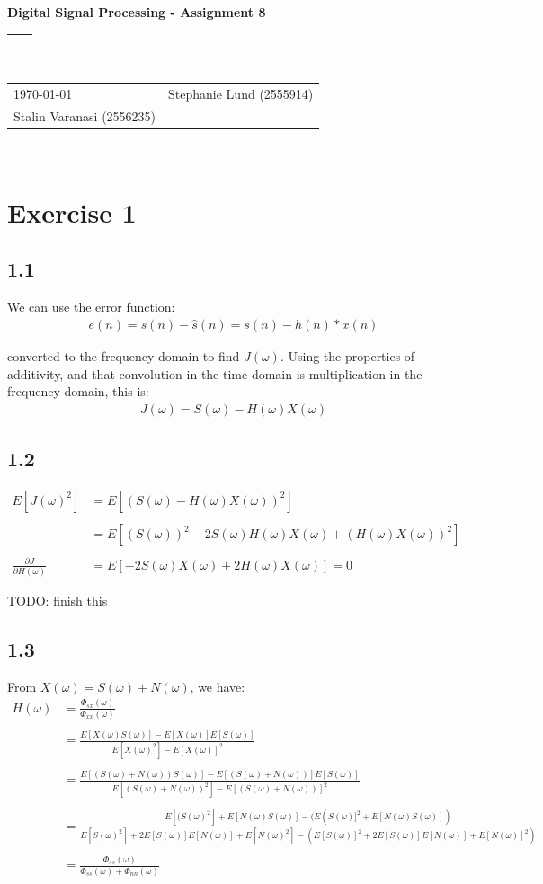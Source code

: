 \documentclass[12pt]{article}
\renewcommand{\title}[1]{\textbf{#1}\\}
\renewcommand{\line}{\begin{tabularx}{\textwidth}{X>{\raggedleft}X}\hline\\\end{tabularx}\\[-0.5cm]}
\newcommand{\leftright}[2]{\begin{tabularx}{\textwidth}{X>{\raggedleft}X}#1%
& #2\\\end{tabularx}\\[-0.5cm]}
\begin{document}
\title{Digital Signal Processing - Assignment 8}
\line
\leftright{\today}{Stephanie Lund (2555914)\\Stalin Varanasi (2556235)} %

\section*{Exercise 1}

\subsection*{1.1}
We can use the error function:
\begin{align*}
e(n) = s(n) - \hat{s}(n) = s(n) - h(n) \ast x(n)
\end{align*}

converted to the frequency domain to find $J(\omega)$. Using the properties of additivity, and that convolution in the time domain is multiplication in the frequency domain, this is:
\begin{align*}
J(\omega) = S(\omega) - H(\omega)X(\omega)
\end{align*}

\subsection*{1.2}
\begin{align*}
E[J(\omega)^2] &= E[(S(\omega) - H(\omega)X(\omega))^2] \\\\
&= E[(S(\omega))^2 - 2S(\omega)H(\omega)X(\omega) + (H(\omega)X(\omega))^2] \\\\
\frac{\partial J}{\partial H(\omega)} &= E[-2S(\omega)X(\omega) + 2H(\omega)X(\omega)] = 0
\end{align*}

TODO: finish this

\subsection*{1.3}
From $X(\omega) = S(\omega) + N(\omega)$, we have:
\begin{align*}
H(\omega) &= \frac{\Phi_{sx}(\omega)}{\Phi_{xx}(\omega)} \\ \\
&=
\frac{E[X(\omega)S(\omega)] - E[X(\omega)]E[S(\omega)]}{E[X(\omega)^2] - E[X(\omega)]^2}\\ \\
&=
\frac{E[(S(\omega) + N(\omega))S(\omega)] -  E[(S(\omega) + N(\omega))]E[S(\omega)]}
{E[(S(\omega) + N(\omega))^2] - E[(S(\omega) + N(\omega))]^2} \\ \\
&=
\frac{E[(S(\omega)^2] + E[N(\omega)S(\omega)] -  (E(S(\omega)]^2 + E[N(\omega)S(\omega)])}
{E[S(\omega)^2] + 2E[S(\omega)]E[N(\omega)] + E[N(\omega)^2] - (E[S(\omega)]^2 + 2E[S(\omega)]E[N(\omega)] + E[N(\omega)]^2)} \\ \\
&=
\frac{\Phi_{ss}(\omega)}
{\Phi_{ss}(\omega) + \Phi_{nn}(\omega)}
\end{align*}
\end{document}
